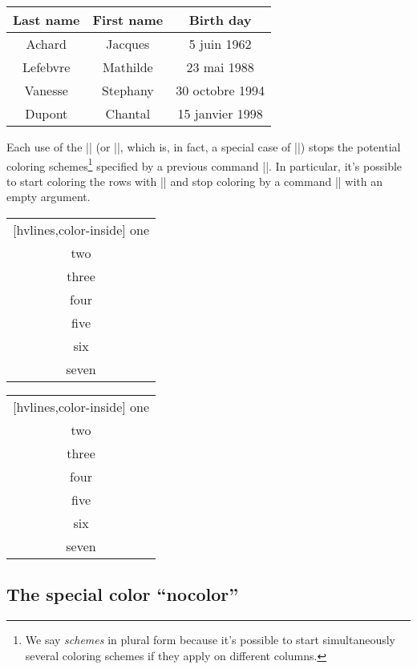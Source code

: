\documentclass[dvipsnames]{article}%
\begin{document}
\begin{center}
\NewDocumentCommand { \Blue } { } {  }
\begin{NiceTabular}{>{\Blue}c>{\Blue}cc} 
\toprule
{}
Last name & First name & Birth day \\
\midrule
Achard  & Jacques & 5 juin 1962 \\
Lefebvre & Mathilde & 23 mai 1988 \\
Vanesse & Stephany & 30 octobre 1994 \\
Dupont & Chantal & 15 janvier 1998 \\
\bottomrule
\end{NiceTabular}
\end{center}

\bigskip
Each use of the |\rowlistcolors| (or |\rowcolors|, which is, in fact, a
special case of |\rowlistcolors|) stops the potential coloring
schemes\footnote{We say \emph{schemes} in plural form because it's possible to
  start simultaneously several coloring schemes if they apply on different
  columns.} specified by a previous command |\rowlistcolors|. In particular,
it's possible to start coloring the rows with || and stop
coloring by a command |\rowlistcolors| with an empty argument.

\bigskip
\begin{Code}[width=10cm]
\begin{NiceTabular}{c}[hvlines,color-inside]
one \\
two \\
\emph{}
three \\
four \\
five \\
\emph{\rowlistcolors{}}
six \\
seven \\
\end{NiceTabular}
\end{Code}
\begin{NiceTabular}{c}[hvlines,color-inside]
one \\
two \\
three \\
four \\
five \\
\rowlistcolors{}
six \\
seven \\
\end{NiceTabular}


\subsection{The special color ``nocolor''}
\end{document}
